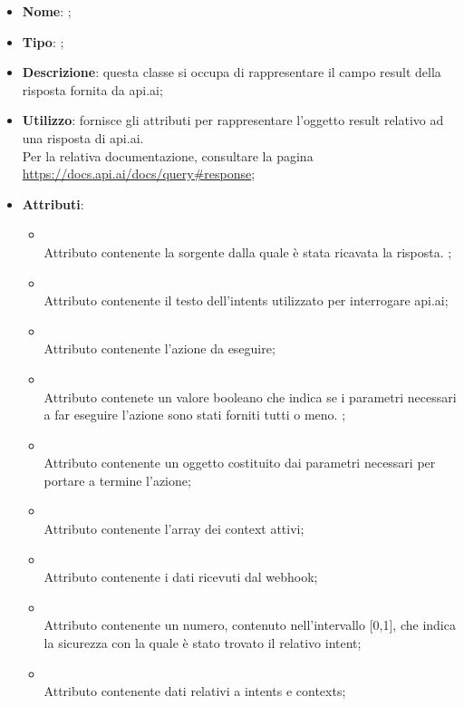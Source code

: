 \begin{itemize}
	\item \textbf{Nome}: ;
	\item \textbf{Tipo}: ;
	\item \textbf{Descrizione}: questa classe si occupa di rappresentare il campo result della risposta fornita da api.ai;
	\item \textbf{Utilizzo}: fornisce gli attributi per rappresentare l'oggetto result relativo ad una risposta di api.ai. \\
Per la relativa documentazione, consultare la pagina \url{https://docs.api.ai/docs/query#response};
	\item \textbf{Attributi}:
	\begin{itemize}
		\item[]  \\
		Attributo contenente la sorgente dalla quale è stata ricavata la risposta. ;
		\item[]  \\
		Attributo contenente il testo dell'intents utilizzato per interrogare api.ai;
		\item[]  \\
		Attributo contenente l'azione da eseguire;
		\item[]  \\
		Attributo contenete un valore booleano che indica se i parametri necessari a far eseguire l'azione sono stati forniti tutti o meno. ;
		\item[]  \\
		Attributo contenente un oggetto costituito dai parametri necessari per portare a termine l'azione;
		\item[]  \\
		Attributo contenente l'array dei context attivi;
		\item[]  \\
		Attributo contenente i dati ricevuti dal webhook;
		\item[]  \\
		Attributo contenente un numero, contenuto nell'intervallo [0,1], che indica la sicurezza con  la quale è stato trovato il relativo intent;
		\item[]  \\
		Attributo contenente dati relativi a intents e contexts;
	\end{itemize}
\end{itemize}

